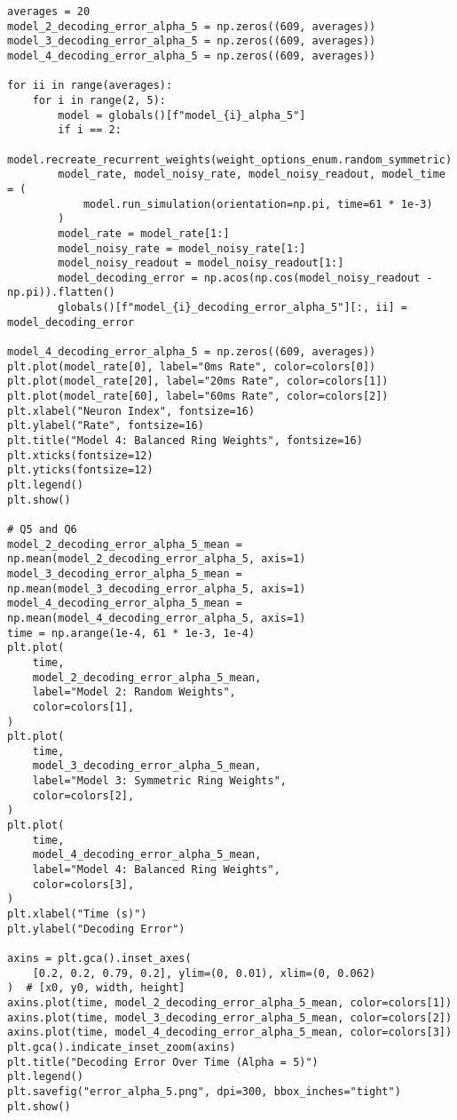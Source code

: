 \documentclass[a4paper, 11pt, oneside]{report}
\begin{document}
\begin{verbatim}
averages = 20
model_2_decoding_error_alpha_5 = np.zeros((609, averages))
model_3_decoding_error_alpha_5 = np.zeros((609, averages))
model_4_decoding_error_alpha_5 = np.zeros((609, averages))

for ii in range(averages):
    for i in range(2, 5):
        model = globals()[f"model_{i}_alpha_5"]
        if i == 2:
            model.recreate_recurrent_weights(weight_options_enum.random_symmetric)
        model_rate, model_noisy_rate, model_noisy_readout, model_time = (
            model.run_simulation(orientation=np.pi, time=61 * 1e-3)
        )
        model_rate = model_rate[1:]
        model_noisy_rate = model_noisy_rate[1:]
        model_noisy_readout = model_noisy_readout[1:]
        model_decoding_error = np.acos(np.cos(model_noisy_readout - np.pi)).flatten()
        globals()[f"model_{i}_decoding_error_alpha_5"][:, ii] = model_decoding_error

model_4_decoding_error_alpha_5 = np.zeros((609, averages))
plt.plot(model_rate[0], label="0ms Rate", color=colors[0])
plt.plot(model_rate[20], label="20ms Rate", color=colors[1])
plt.plot(model_rate[60], label="60ms Rate", color=colors[2])
plt.xlabel("Neuron Index", fontsize=16)
plt.ylabel("Rate", fontsize=16)
plt.title("Model 4: Balanced Ring Weights", fontsize=16)
plt.xticks(fontsize=12)
plt.yticks(fontsize=12)
plt.legend()
plt.show()

# Q5 and Q6
model_2_decoding_error_alpha_5_mean = np.mean(model_2_decoding_error_alpha_5, axis=1)
model_3_decoding_error_alpha_5_mean = np.mean(model_3_decoding_error_alpha_5, axis=1)
model_4_decoding_error_alpha_5_mean = np.mean(model_4_decoding_error_alpha_5, axis=1)
time = np.arange(1e-4, 61 * 1e-3, 1e-4)
plt.plot(
    time,
    model_2_decoding_error_alpha_5_mean,
    label="Model 2: Random Weights",
    color=colors[1],
)
plt.plot(
    time,
    model_3_decoding_error_alpha_5_mean,
    label="Model 3: Symmetric Ring Weights",
    color=colors[2],
)
plt.plot(
    time,
    model_4_decoding_error_alpha_5_mean,
    label="Model 4: Balanced Ring Weights",
    color=colors[3],
)
plt.xlabel("Time (s)")
plt.ylabel("Decoding Error")

axins = plt.gca().inset_axes(
    [0.2, 0.2, 0.79, 0.2], ylim=(0, 0.01), xlim=(0, 0.062)
)  # [x0, y0, width, height]
axins.plot(time, model_2_decoding_error_alpha_5_mean, color=colors[1])
axins.plot(time, model_3_decoding_error_alpha_5_mean, color=colors[2])
axins.plot(time, model_4_decoding_error_alpha_5_mean, color=colors[3])
plt.gca().indicate_inset_zoom(axins)
plt.title("Decoding Error Over Time (Alpha = 5)")
plt.legend()
plt.savefig("error_alpha_5.png", dpi=300, bbox_inches="tight")
plt.show()


\end{verbatim}
\end{document}
